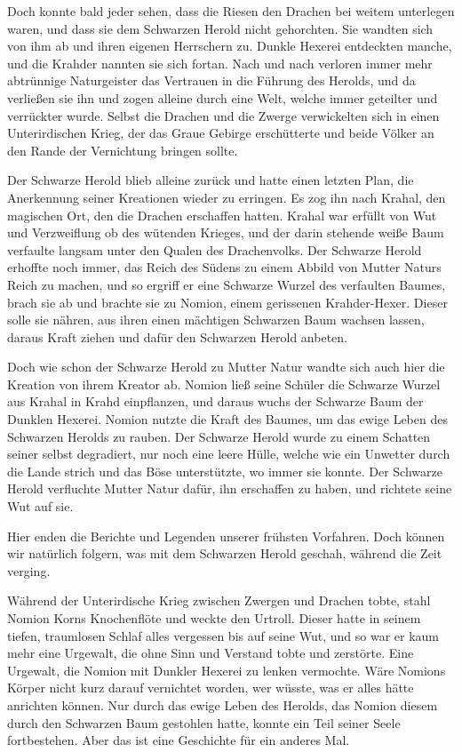 Doch konnte bald jeder sehen, dass die Riesen den Drachen bei weitem unterlegen waren, und dass sie dem Schwarzen Herold nicht gehorchten. Sie wandten sich von ihm ab und ihren eigenen Herrschern zu. Dunkle Hexerei entdeckten manche, und die Krahder nannten sie sich fortan. Nach und nach verloren immer mehr abtrünnige Naturgeister das Vertrauen in die Führung des Herolds, und da verließen sie ihn und zogen alleine durch eine Welt, welche immer geteilter und verrückter wurde. Selbst die Drachen und die Zwerge verwickelten sich in einen Unterirdischen Krieg, der das Graue Gebirge erschütterte und beide Völker an den Rande der Vernichtung bringen sollte.

Der Schwarze Herold blieb alleine zurück und hatte einen letzten Plan, die Anerkennung seiner Kreationen wieder zu erringen. Es zog ihn nach Krahal, den magischen Ort, den die Drachen erschaffen hatten. Krahal war erfüllt von Wut und Verzweiflung ob des wütenden Krieges, und der darin stehende weiße Baum verfaulte langsam unter den Qualen des Drachenvolks. Der Schwarze Herold erhoffte noch immer, das Reich des Südens zu einem Abbild von Mutter Naturs Reich zu machen, und so ergriff er eine Schwarze Wurzel des verfaulten Baumes, brach sie ab und brachte sie zu Nomion, einem gerissenen Krahder-Hexer. Dieser solle sie nähren, aus ihren einen mächtigen Schwarzen Baum wachsen lassen, daraus Kraft ziehen und dafür den Schwarzen Herold anbeten.

Doch wie schon der Schwarze Herold zu Mutter Natur wandte sich auch hier die Kreation von ihrem Kreator ab. Nomion ließ seine Schüler die Schwarze Wurzel aus Krahal in Krahd einpflanzen, und daraus wuchs der Schwarze Baum der Dunklen Hexerei. Nomion nutzte die Kraft des Baumes, um das ewige Leben des Schwarzen Herolds zu rauben. Der Schwarze Herold wurde zu einem Schatten seiner selbst degradiert, nur noch eine leere Hülle, welche wie ein Unwetter durch die Lande strich und das Böse unterstützte, wo immer sie konnte. Der Schwarze Herold verfluchte Mutter Natur dafür, ihn erschaffen zu haben, und richtete seine Wut auf sie.

\trennzeichen

Hier enden die Berichte und Legenden unserer frühsten Vorfahren. Doch können wir natürlich folgern, was mit dem Schwarzen Herold geschah, während die Zeit verging.

Während der Unterirdische Krieg zwischen Zwergen und Drachen tobte, stahl Nomion Korns Knochenflöte und weckte den Urtroll. Dieser hatte in seinem tiefen, traumlosen Schlaf alles vergessen bis auf seine Wut, und so war er kaum mehr eine Urgewalt, die ohne Sinn und Verstand tobte und zerstörte. Eine Urgewalt, die Nomion mit Dunkler Hexerei zu lenken vermochte. Wäre Nomions Körper nicht kurz darauf vernichtet worden, wer wüsste, was er alles hätte anrichten können. Nur durch das ewige Leben des Herolds, das Nomion diesem durch den Schwarzen Baum gestohlen hatte, konnte ein Teil seiner Seele fortbestehen. Aber das ist eine Geschichte für ein anderes Mal.

